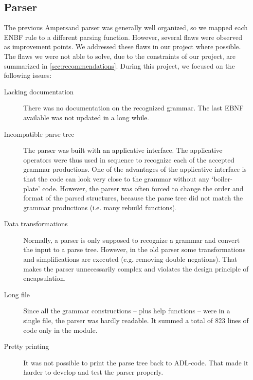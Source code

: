 
\subsection{Parser}
\label{analysis:parser}
The previous Ampersand parser was generally well organized, so we mapped each ENBF rule to a different parsing function.
However, several flaws were observed as improvement points.
We addressed these flaws in our project where possible.
The flaws we were not able to solve, due to the constraints of our project, are summarized in \autoref{sec:recommendations}.
During this project, we focused on the following issues:
\begin{description}
  \item[Lacking documentation]
    There was no documentation on the recognized grammar.
    The last EBNF available was not updated in a long while.
  
  \item[Incompatible parse tree]
    The parser was built with an applicative interface.
    The applicative operators were thus used in sequence to recognize each of the accepted grammar productions.
    One of the advantages of the applicative interface is that the code can look very close to the grammar without any `boiler-plate' code.
    However, the parser was often forced to change the order and format of the parsed structures, because the parse tree did not match the grammar productions (i.e. many rebuild functions).
  
  \item[Data transformations]
    Normally, a parser is only supposed to recognize a grammar and convert the input to a parse tree.
    However, in the old parser some transformations and simplifications are executed (e.g. removing double negations).
    That makes the parser unnecessarily complex and violates the design principle of encapsulation.
  
  \item[Long file]
    Since all the grammar constructions -- plus help functions -- were in a single file, the parser was hardly readable.
    It summed a total of 823 lines of code only in the  module.
  
  \item[Pretty printing]
    It was not possible to print the parse tree back to ADL-code.
    That made it harder to develop and test the parser properly.
  

\end{description}
